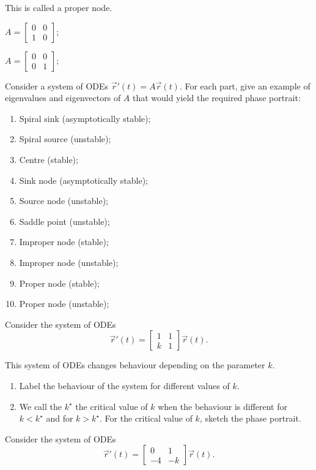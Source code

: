 \begin{exercises}
\begin{problist}
\begin{enumerate}
\begin{minipage}{.2\textwidth}
		This is called a proper node.
		\item $A = \begin{bmatrix} 0 & 0 \\ 1 & 0\end{bmatrix}$; 
		\item $A = \begin{bmatrix} 0 & 0 \\ 0 & 1\end{bmatrix}$; 
	\end{minipage}
	\end{enumerate}
	
	\prob Consider a system of ODEs $\vec{r}'(t) = A \vec{r}(t)$.
	For each part, give an example of eigenvalues and eigenvectors of $A$ that would yield the required phase portrait:
	\begin{enumerate}
		\item Spiral sink (asymptotically stable);
		\item Spiral source (unstable);
		\item Centre (stable);
		\item Sink node (asymptotically stable);
		\item Source node (unstable);
		\item Saddle point (unstable);
		\item Improper node (stable);
		\item Improper node (unstable);
		\item Proper node (stable);
		\item Proper node (unstable);
	\end{enumerate}
	
	\prob Consider the system of ODEs
	$$
	\vec{r}'(t) = 
	\begin{bmatrix}
	1 & 1 \\ k & 1
	\end{bmatrix}\vec{r}(t).
	$$

	This system of ODEs changes behaviour depending on the parameter $k$.
	\begin{enumerate}
		\item Label the behaviour of the system for different values of $k$.
		\item We call the $k^\star$ the critical value of $k$ when the behaviour is different for $k<k^\star$ and for $k>k^\star$. For the critical value of $k$, sketch the phase portrait.
	\end{enumerate}
	
	
	\prob Consider the system of ODEs
	$$
	\vec{r}'(t) = 
	\begin{bmatrix}
	0 & 1 \\ -4 & -k
	\end{bmatrix}\vec{r}(t).
	$$


\end{problist}
\end{exercises}
